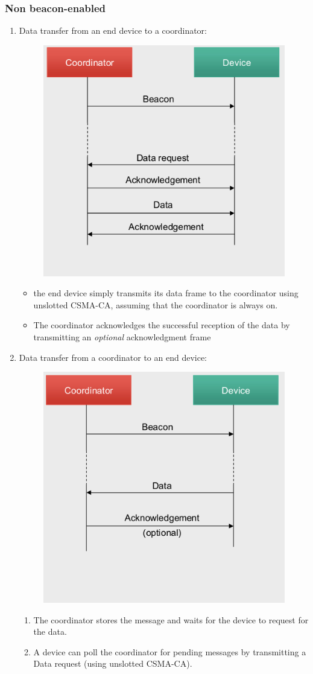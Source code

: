 \begin{itemize}
\newpage
\subsubsection{Non beacon-enabled}
\begin{enumerate}
   \item Data transfer from an end device to a coordinator:
   \begin{figure}[htbp]
      \centering
      \includegraphics[width=0.3\columnwidth]{images/802_datatransfer_3.png}
      \label{fig:802_datatransfer_3}
   \end{figure}
   \begin{itemize}
      \item the end device simply transmits its data frame to the coordinator using unslotted CSMA-CA, assuming that the coordinator is always on.
      \item The coordinator acknowledges the successful reception of the data by transmitting an \textit{optional} acknowledgment frame
   \end{itemize}
   \item Data transfer from a coordinator to an end device:
   \begin{figure}[htbp]
      \centering
      \includegraphics[width=0.3\columnwidth]{images/802_datatransfer_4.png}
      \label{fig:802_datatransfer_4}
   \end{figure}
   \begin{enumerate}
      \item The coordinator stores the message and waits for
      the device to request for the data.
      \item A device can poll the coordinator for pending messages by transmitting a Data request (using unslotted CSMA-CA).

\end{enumerate}
\end{enumerate}
\end{itemize}
